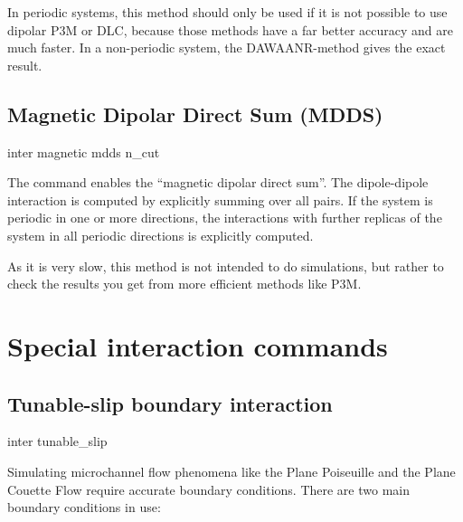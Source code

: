 In periodic systems, this method should only be used if it is not possible to use dipolar P3M or
DLC, because those methods have a far better accuracy and are much faster.
In a non-periodic system, the DAWAANR-method gives the exact result.

\subsection{Magnetic Dipolar Direct Sum (MDDS)}

\begin{essyntax}
  inter magnetic  mdds n\_cut 
  \begin{features}
  \end{features}
\end{essyntax}

The command enables the ``magnetic dipolar direct sum''.  The
dipole-dipole interaction is computed by explicitly summing over all
pairs. If the system is periodic in one or more directions, the
interactions with further  replicas of the system
in all periodic directions is explicitly computed.

As it is very slow, this method is not intended to do simulations,
but rather to check the results you get from more efficient methods
like P3M.
  
\section{Special interaction commands}
\label{sec:inter-other}

\subsection{Tunable-slip boundary interaction}\label{sec:tunableSlip}
\begin{essyntax}
  inter  
  tunable_slip    
    
  \begin{features}
  \end{features}
\end{essyntax}
Simulating microchannel flow phenomena like the Plane Poiseuille and
the Plane Couette Flow require accurate boundary conditions. There are
two main boundary conditions in use:

